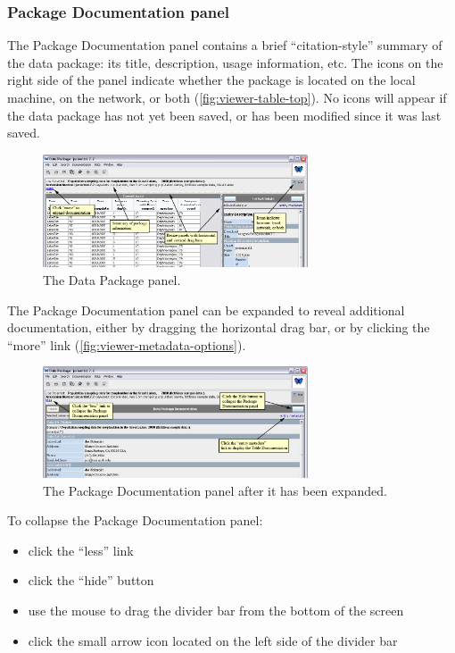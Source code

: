 \subsubsection{Package Documentation panel} \label{sec:panel-dp-doc}

The Package Documentation panel contains a brief ``citation-style''
summary of the data package: its title, description, usage information,
etc. The icons on the right side of the panel indicate whether the
package is located on the local machine, on the network, or both
(\autoref{fig:viewer-table-top}). No icons will appear if the data
package has not yet been saved, or has been modified since it was last
saved.

\begin{figure}
  \centering
    \includegraphics[width=0.7\textwidth]{images/viewer-table-top.jpg}
  \caption{The Data Package panel.}
  \label{fig:viewer-table-top}
\end{figure}

The Package Documentation panel can be expanded to reveal additional
documentation, either by dragging the horizontal drag bar, or by
clicking the ``more'' link (\autoref{fig:viewer-metadata-options}).

\begin{figure}
  \centering
    \includegraphics[width=0.7\textwidth]{images/viewer-metadata-options.jpg}
  \caption{The Package Documentation panel after it has been expanded.}
  \label{fig:viewer-metadata-options}
\end{figure}


To collapse the Package Documentation panel:
\begin{itemize}
  \setlength{\parskip}{1pt}
  \item click the ``less'' link 
  \item click the ``hide'' button 
  \item use the mouse to drag the divider bar from the bottom of the
    screen
  \item click the small arrow icon located on the left side of the
    divider bar 
\end{itemize}

